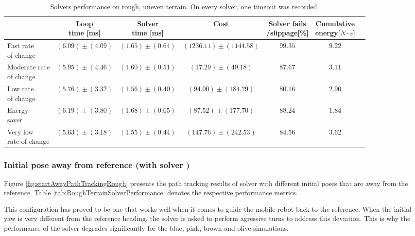 \begin{table}[!htb]
  \caption[Solver performance over irregular, rigid terrain.]{Solvers performance on rough, uneven terrain. On every solver, one timeout was recorded.}
  \label{tab:RoughTerrainSolverPerformanceShortTrack}
  \renewcommand{\arraystretch}{1.2}
  \centering
  \small
  \begin{tabular}[]{lcccccc}
	\toprule
	& \shortstack{Loop\\time [ms]} & \shortstack{Solver\\time [ms]} & Cost & \shortstack{Solver fails\\/slippage[\%]} & \shortstack{Cumulative\\energy}[$N \cdot s$]\\
	\midrule
	\shortstack{Fast rate\\of change} & $(6.09) \pm (4.09)$ & $(1.65) \pm (0.64)$ & $(1236.11) \pm (1144.58)$ & $99.35$ & $9.22$\\
	\shortstack{Moderate rate\\of change} & $(5.95) \pm (4.46)$ & $(1.60) \pm (0.51)$ & $(17.29) \pm (49.18)$ & $87.67$ & $3.11$\\
	\shortstack{Low rate\\of change} & $(5.76) \pm (3.32)$ & $(1.56) \pm (0.40)$ & $(94.00) \pm (184.79)$ & $80.16$ & $2.90$\\
	\shortstack{Energy\\saver} & $(6.19) \pm (3.80)$ & $(1.68) \pm (0.65)$ & $(87.52) \pm (177.70)$ & $88.24$ & $1.84$\\
	\shortstack{Very low\\rate of change} & $(5.63) \pm (3.18)$ & $(1.55) \pm (0.44)$ & $(147.76) \pm (242.53)$ & $84.56$ & $3.62$\\
  	\bottomrule
  \end{tabular}
\end{table}

\subsubsection*{Initial pose away from reference (with solver )}

Figure \ref{fig:startAwayPathTrackingRough} presents the path tracking results of solver  with different initial poses that are away from the reference. Table \ref{tab:RoughTerrainSolverPerformance} denotes the respective performance metrics.

This configuration has proved to be one that works well when it comes to guide the mobile robot back to the reference. When the initial yaw is very different from the reference heading, the solver is asked to perform agressive turns to address this deviation. This is why the performance of the solver degrades significantly for the \textcolor{tabblue}{blue}, \textcolor{tabpink}{pink}, \textcolor{tabbrown}{brown} and \textcolor{tabolive}{olive} simulations. 

